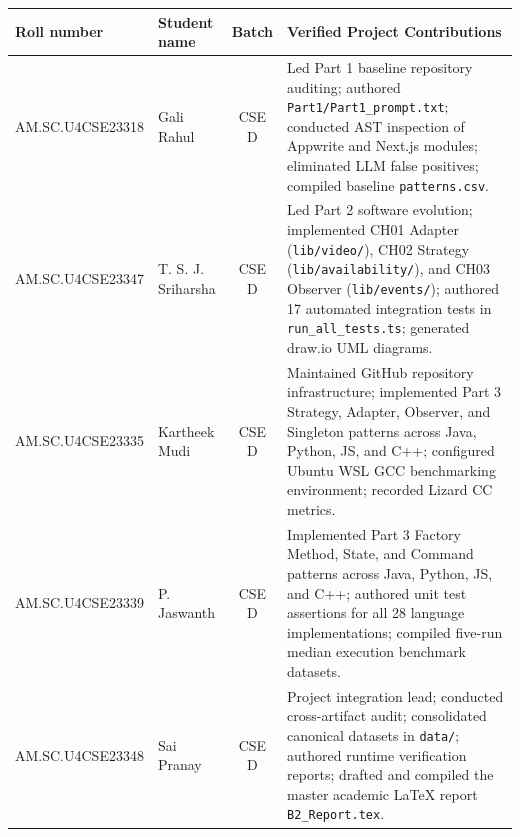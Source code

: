 \documentclass[11pt,a4paper]{article}
\begin{document}
\begin{tabularx}{\linewidth}{@{}p{33mm}p{28mm}cX@{}}\toprule
Roll number & Student name & Batch & Verified Project Contributions\\\midrule
AM.SC.U4CSE23318 & Gali Rahul & CSE D & Led Part 1 baseline repository auditing; authored \texttt{Part1/Part1\_prompt.txt}; conducted AST inspection of Appwrite and Next.js modules; eliminated LLM false positives; compiled baseline \texttt{patterns.csv}.\\
AM.SC.U4CSE23347 & T. S. J. Sriharsha & CSE D & Led Part 2 software evolution; implemented CH01 Adapter (\texttt{lib/video/}), CH02 Strategy (\texttt{lib/availability/}), and CH03 Observer (\texttt{lib/events/}); authored 17 automated integration tests in \texttt{run\_all\_tests.ts}; generated draw.io UML diagrams.\\
AM.SC.U4CSE23335 & Kartheek Mudi & CSE D & Maintained GitHub repository infrastructure; implemented Part 3 Strategy, Adapter, Observer, and Singleton patterns across Java, Python, JS, and C++; configured Ubuntu WSL GCC benchmarking environment; recorded Lizard CC metrics.\\
AM.SC.U4CSE23339 & P. Jaswanth & CSE D & Implemented Part 3 Factory Method, State, and Command patterns across Java, Python, JS, and C++; authored unit test assertions for all 28 language implementations; compiled five-run median execution benchmark datasets.\\
AM.SC.U4CSE23348 & Sai Pranay & CSE D & Project integration lead; conducted cross-artifact audit; consolidated canonical datasets in \texttt{data/}; authored runtime verification reports; drafted and compiled the master academic LaTeX report \texttt{B2\_Report.tex}.\\\bottomrule
\end{tabularx}
\end{document}
